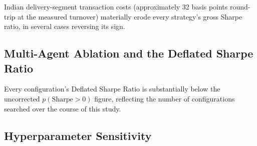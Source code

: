 \documentclass[10pt,conference]{IEEEtran}
\begin{document}
Indian delivery-segment transaction costs (approximately 32 basis points
round-trip at the measured turnover) materially erode every strategy's gross
Sharpe ratio, in several cases reversing its sign.

\subsection{Multi-Agent Ablation and the Deflated Sharpe Ratio}

\begin{table}[htbp]
\centering
\caption{Multi-agent ablation: block-bootstrap confidence intervals and Deflated Sharpe Ratio (Bailey \& L\'opez de Prado), correcting for the multiple configurations searched over the course of this study.}
\label{tab:multi-agent-dsr}
\end{table}

Every configuration's Deflated Sharpe Ratio is substantially below the
uncorrected $p(\text{Sharpe} > 0)$ figure, reflecting the number of
configurations searched over the course of this study.

\subsection{Hyperparameter Sensitivity}
\end{document}
